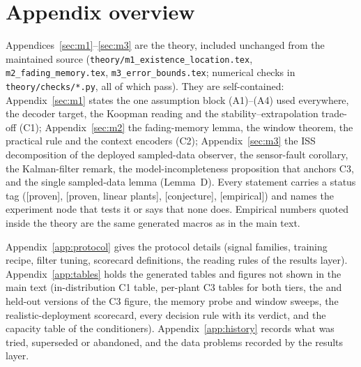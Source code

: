 \section*{Appendix overview}

Appendices~\ref{sec:m1}--\ref{sec:m3} are the theory, included unchanged from the maintained source (\texttt{theory/m1\_existence\_location.tex}, \texttt{m2\_fading\_memory.tex}, \texttt{m3\_error\_bounds.tex}; numerical checks in \texttt{theory/checks/*.py}, all of which pass). They are self-contained: Appendix~\ref{sec:m1} states the one assumption block (A1)--(A4) used everywhere, the decoder target, the Koopman reading and the stability--extrapolation trade-off (C1); Appendix~\ref{sec:m2} the fading-memory lemma, the window theorem, the practical rule and the context encoders (C2); Appendix~\ref{sec:m3} the ISS decomposition of the deployed sampled-data observer, the sensor-fault corollary, the Kalman-filter remark, the model-incompleteness proposition that anchors C3, and the single sampled-data lemma (Lemma~D). Every statement carries a status tag ([proven], [proven, linear plants], [conjecture], [empirical]) and names the experiment node that tests it or says that none does. Empirical numbers quoted inside the theory are the same generated macros as in the main text.

Appendix~\ref{app:protocol} gives the protocol details (signal families, training recipe, filter tuning, scorecard definitions, the reading rules of the results layer). Appendix~\ref{app:tables} holds the generated tables and figures not shown in the main text (in-distribution C1 table, per-plant C3 tables for both tiers, the  and held-out versions of the C3 figure, the memory probe and window sweeps, the realistic-deployment scorecard, every decision rule with its verdict, and the capacity table of the conditioners). Appendix~\ref{app:history} records what was tried, superseded or abandoned, and the data problems recorded by the results layer.

